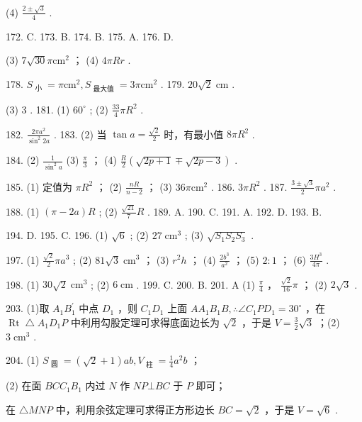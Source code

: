 \documentclass[10pt]{article}
\newcommand*\circled[1]{\tikz[baseline=(char.base)]{\node[shape=circle,draw,inner sep=1.5pt] (char) {\small #1};}}
\begin{document}
(4) \(\frac{2 \pm  \sqrt{3}}{4}\) .

172. C. 173. B. 174. B. 175. A. 176. D.

(3) \(7\sqrt{30}\pi {\mathrm{{cm}}}^{2}\) ； (4) \({4\pi Rr}\) .

178. \({S}_{\text{ 小 }} = \pi {\mathrm{{cm}}}^{2},{S}_{\text{ 最大值 }} = {3\pi }{\mathrm{{cm}}}^{2}\) . 179. \({20}\sqrt{2}\mathrm{\;{cm}}\) .

(3) 3 . 181. (1) \({60}^{ \circ  }\) ; (2) \(\frac{33}{4}\pi {R}^{2}\) .

182. \(\frac{{2\pi }{a}^{2}}{{\sin }^{2}{2a}}\) . 183. (2) 当 \(\tan a = \frac{\sqrt{2}}{2}\) 时，有最小值 \({8\pi }{R}^{2}\) .

184. (2) \(\frac{1}{{\sin }^{2}a}\) (3) \(\frac{\pi }{3}\) ； (4) \(\frac{R}{2}\left( {\sqrt{{2p} + 1} \mp  \sqrt{{2p} - 3}}\right)\) .

185. (1) 定值为 \(\pi {R}^{2}\) ； (2) \(\frac{nR}{n - 2}\) ； (3) \({36\pi }{\mathrm{{cm}}}^{2}\) . 186. \({3\pi }{R}^{2}\) . 187. \(\frac{3 \pm  \sqrt{3}}{2}\pi {a}^{2}\) .

188. (1) \(\left( {\pi  - {2a}}\right) R\) ; (2) \(\frac{\sqrt{21}}{7}R\) . 189. A. 190. C. 191. A. 192. D. 193. B.

194. D. 195. C. 196. (1) \(\sqrt{6}\) ; (2) \({27}{\mathrm{\;{cm}}}^{3}\) ; (3) \(\sqrt{{S}_{1}{S}_{2}{S}_{3}}\) .

197. (1) \(\frac{\sqrt{2}}{2}\pi {a}^{3}\) ; (2) \({81}\sqrt{3}{\mathrm{\;{cm}}}^{3}\) ； (3) \({r}^{2}h\) ； (4) \(\frac{2{b}^{3}}{{a}^{2}}\) ； (5) \(2 : 1\) ； (6) \(\frac{3{H}^{3}}{4\pi }\) .

198. (1) \({30}\sqrt{2}{\mathrm{\;{cm}}}^{3}\) ; (2) \(6\mathrm{\;{cm}}\) . 199. C. 200. B. 201. A (1) \(\frac{\pi }{4}\) ， \(\frac{\sqrt{2}}{16}\pi\) ； (2) \(2\sqrt{3}\) .

203. (1)取 \({A}_{1}{B}_{1}^{\prime }\) 中点 \({D}_{1}\) ，则 \({C}_{1}{D}_{1}\) 上面 \(A{A}_{1}{B}_{1}B,\therefore \angle {C}_{1}P{D}_{1} = {30}^{ \circ  }\) ，在 \(\operatorname{Rt}\bigtriangleup {A}_{1}{D}_{1}P\) 中利用勾股定理可求得底面边长为 \(\sqrt{2}\) ，于是 \(V = \frac{3}{2}\sqrt{3}\) ；(2) \(3{\mathrm{\;{cm}}}^{3}\) .

204. (1) \({S}_{\text{ 圆 }} = \left( {\sqrt{2} + 1}\right) {ab},{V}_{\text{ 柱 }} = \frac{1}{4}{a}^{2}b\) ；

(2) \circled{1} 在面 \({BC}{C}_{1}{B}_{1}\) 内过 \(N\) 作 \({NP} \bot  {BC}\) 于 \(P\) 即可；

 \circled{2} 在 \(\bigtriangleup  {MNP}\) 中，利用余弦定理可求得正方形边长 \({BC} = \sqrt{2}\) ，于是 \(V = \sqrt{6}\) .
\end{document}
